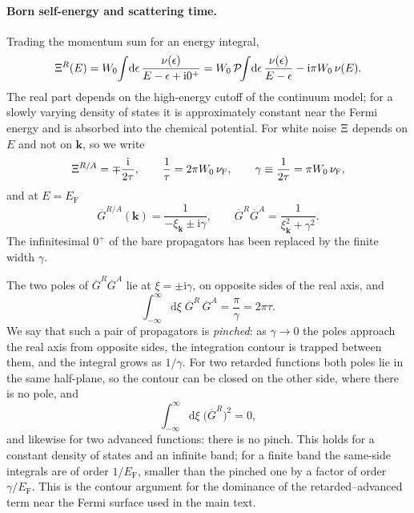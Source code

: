 \paragraph{Born self-energy and scattering time.}
Trading the momentum sum for an energy integral,
\[
\Xi^{R}(E)
=W_0\!\int\!\mathrm{d}\epsilon\,
\frac{\nu(\epsilon)}{E-\epsilon+\mathrm{i}0^+}
=W_0\,\mathcal P\!\!\int\!\mathrm{d}\epsilon\,
\frac{\nu(\epsilon)}{E-\epsilon}
-\mathrm{i}\pi W_0\,\nu(E).
\]
The real part depends on the high-energy cutoff of the continuum
model; for a slowly varying density of states it is approximately
constant near the Fermi energy and is absorbed into the chemical
potential. For white noise $\Xi$ depends on $E$ and not on
$\mathbf k$, so we write
\begin{equation}
\Xi^{R/A}=\mp\frac{\mathrm{i}}{2\tau},\qquad
\frac1\tau=2\pi W_0\,\nu_{\mathrm F},\qquad
\gamma\equiv\frac1{2\tau}
=\pi W_0\,\nu_{\mathrm F},
\label{eq:tau}
\end{equation}
and at $E=E_{\mathrm F}$
\begin{equation}
\overline G^{R/A}(\mathbf k)
=\frac{1}{-\xi_{\mathbf k}\pm\mathrm{i}\gamma},
\qquad
\overline G^R\overline G^A
=\frac{1}{\xi_{\mathbf k}^2+\gamma^2}.
\label{eq:Gavg}
\end{equation}
The infinitesimal $0^+$ of the bare propagators has been replaced
by the finite width $\gamma$.

The two poles of $\overline G^R\overline G^A$ lie at
$\xi=\pm\mathrm{i}\gamma$, on opposite sides of the real axis, and
\begin{equation}
\int_{-\infty}^{\infty}\mathrm{d}\xi\;
\overline G^R\,\overline G^A
=\frac{\pi}{\gamma}=2\pi\tau.
\label{eq:pinch}
\end{equation}
We say that such a pair of propagators is \emph{pinched}: as
$\gamma\to0$ the poles approach the real axis from opposite sides,
the integration contour is trapped between them, and the
integral grows as $1/\gamma$. For two retarded functions both
poles lie in the same half-plane, so the contour can be closed on
the other side, where there is no pole, and
\[
\int_{-\infty}^{\infty}\mathrm{d}\xi\;
\big(\overline G^R\big)^2=0,
\]
and likewise for two advanced functions: there is no pinch. This
holds for a constant density of states and an infinite band; for
a finite band the same-side integrals are of order $1/E_{\mathrm F}$,
smaller than the pinched one by a factor of order
$\gamma/E_{\mathrm F}$. This is the contour argument for the
dominance of the retarded--advanced term near the Fermi surface
used in the main text.

